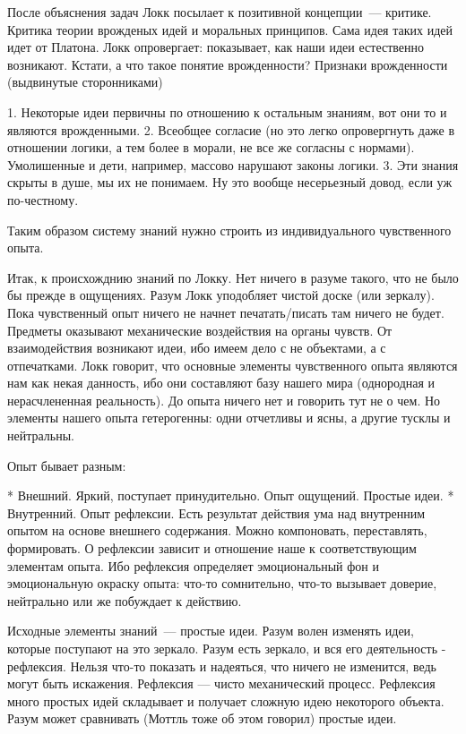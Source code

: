 После объяснения задач Локк посылает к позитивной концепции~--- критике. Критика теории врожденых идей и моральных принципов. Сама идея таких идей идет от Платона. Локк опровергает: показывает, как наши идеи естественно возникают. Кстати, а что такое понятие врожденности? Признаки врожденности (выдвинутые сторонниками)

	1. Некоторые идеи первичны по отношению к остальным знаниям, вот они то и являются врожденными.
	2. Всеобщее согласие (но это легко опровергнуть даже в отношении логики, а тем более в морали, не все же согласны с нормами). Умолишенные и дети, например, массово нарушают законы логики.
	3. Эти знания скрыты в душе, мы их не понимаем. Ну это вообще несерьезный довод, если уж по-честному.

Таким образом систему знаний нужно строить из индивидуального чувственного опыта.

Итак, к происхожднию знаний по Локку. 
Нет ничего в разуме такого, что не было бы прежде в ощущениях. Разум Локк уподобляет чистой доске (или зеркалу). Пока чувственный опыт ничего не начнет печатать/писать там ничего не будет. Предметы оказывают механические воздействия на органы чувств. От взаимодействия возникают идеи, ибо имеем дело с не объектами, а с отпечатками. Локк говорит, что основные элементы чувственного опыта являются нам как некая данность, ибо они составляют базу нашего мира (однородная и нерасчлененная реальность). До опыта ничего нет и говорить тут не о чем. Но элементы нашего опыта гетерогенны: одни отчетливы и ясны, а другие тусклы и нейтральны.

Опыт бывает разным:

	* Внешний. Яркий, поступает принудительно. Опыт ощущений. Простые идеи.
	* Внутренний. Опыт рефлексии. Есть результат действия ума над внутренним опытом на основе внешнего содержания. Можно компоновать, переставлять, формировать. О  рефлексии зависит и отношение наше к соответствующим элементам опыта. Ибо рефлексия определяет эмоциональный фон и эмоциональную окраску опыта: что-то сомнительно, что-то вызывает доверие, нейтрально или же побуждает к действию.

Исходные элементы знаний~--- простые идеи. Разум волен изменять идеи, которые поступают
на это зеркало. Разум есть зеркало, и вся его деятельность - рефлексия. Нельзя что-то показать и надеяться, что ничего не изменится, ведь могут быть искажения. Рефлексия --- чисто механический процесс. Рефлексия много простых идей складывает и получает сложную идею некоторого объекта. Разум может сравнивать (Моттль тоже об этом говорил) простые идеи.

